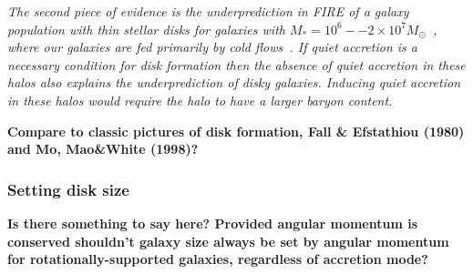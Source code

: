 \documentclass[fleqn,usenatbib]{mnras}
\begin{document}
\textit{
The second piece of evidence is the underprediction in FIRE of a galaxy population with thin stellar disks for galaxies with $M_* = 10^6 -- 2 \times 10^7 M_\odot$~\citep{El-Badry2018a}, where our galaxies are fed primarily by cold flows~\citep{Stern2020}.
If quiet accretion is a necessary condition for disk formation then the absence of quiet accretion in these halos also explains the underprediction of disky galaxies.
Inducing quiet accretion in these halos would require the halo to have a larger baryon content.
}

\textbf{
Compare to classic pictures of disk formation, Fall \& Efstathiou (1980) and Mo, Mao\&White (1998)?
}

\subsubsection{Setting disk size}
\label{s: disk formation -- disk size}

\textbf{
Is there something to say here?
Provided angular momentum is conserved shouldn't galaxy size always be set by angular momentum for rotationally-supported galaxies, regardless of accretion mode?
}






\end{document}
